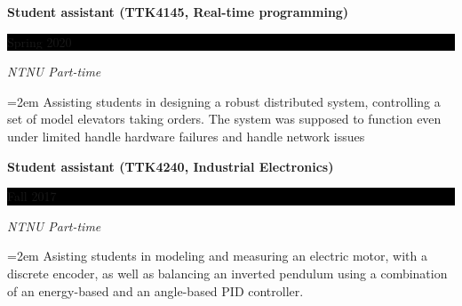 \documentclass[paper=a4,fontsize=11pt,norsk]{scrartcl} %
\newcommand{\EducationEntry}[4]{
		\noindent \textbf{#1} \hfill      %
		\colorbox{Black}{%
			\parbox{6em}{%
			\hfill\color{White}#2}} \par  %
		\noindent \textit{#3} \par        %
		\noindent\hangindent=2em\hangafter=0 \small #4 %
		\normalsize \par}
\begin{document}




\EducationEntry{Student assistant (TTK4145, Real-time programming)}{Spring 2020}{NTNU Part-time}
{Assisting students in designing a robust distributed system, controlling a set of model elevators taking orders. The system was supposed to function even under limited handle hardware failures and handle network issues}

\EducationEntry{Student assistant (TTK4240, Industrial Electronics)}{Fall 2017}{NTNU Part-time}
{Asisting students in modeling and measuring an electric motor,  with a discrete encoder, as well as balancing an inverted pendulum using a combination of an energy-based and an angle-based PID controller.
}
\end{document}

